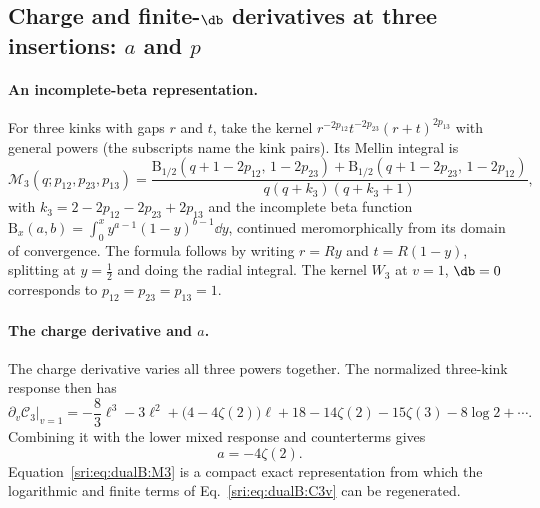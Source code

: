 \subsection{Charge and finite-\texorpdfstring{$\db$}{delta} derivatives at three insertions:
\texorpdfstring{$a$}{a} and \texorpdfstring{$p$}{p}}\label{sri:app:dualB:threeins}
\paragraph{An incomplete-beta representation.} For three kinks with gaps $r$ and $t$, take the kernel
$r^{-2p_{12}}t^{-2p_{23}}(r+t)^{2p_{13}}$ with general powers (the subscripts name the kink pairs). Its Mellin
integral is
\begin{equation}
 \mathcal M_3(q;p_{12},p_{23},p_{13})
 =\frac{\mathrm B_{1/2}(q+1-2p_{12},\,1-2p_{23})+\mathrm B_{1/2}(q+1-2p_{23},\,1-2p_{12})}{q(q+k_3)(q+k_3+1)},
 \label{sri:eq:dualB:M3}
\end{equation}
with $k_3=2-2p_{12}-2p_{23}+2p_{13}$ and the incomplete beta function
$\mathrm B_x(a,b)=\int_0^xy^{a-1}(1-y)^{b-1}\dd y$, continued meromorphically from its domain of convergence. The
formula follows by writing $r=Ry$ and $t=R(1-y)$, splitting at $y=\frac12$ and doing the radial integral. The kernel
$W_3$ at $v=1$, $\db=0$ corresponds to $p_{12}=p_{23}=p_{13}=1$.

\paragraph{The charge derivative and $a$.} The charge derivative varies all three powers together. The normalized
three-kink response then has
\begin{equation}
 \partial_v\mathcal C_3\big|_{v=1}=-\frac83\ell^3-3\ell^2+\bigl(4-4\zeta(2)\bigr)\ell
 +18-14\zeta(2)-15\zeta(3)-8\log2+\cdots.
 \label{sri:eq:dualB:C3v}
\end{equation}
Combining it with the lower mixed response and counterterms gives
\begin{equation}
 a=-4\zeta(2).
\end{equation}
Equation~\eqref{sri:eq:dualB:M3} is a compact exact representation from which the logarithmic and finite terms of
Eq.~\eqref{sri:eq:dualB:C3v} can be regenerated.

